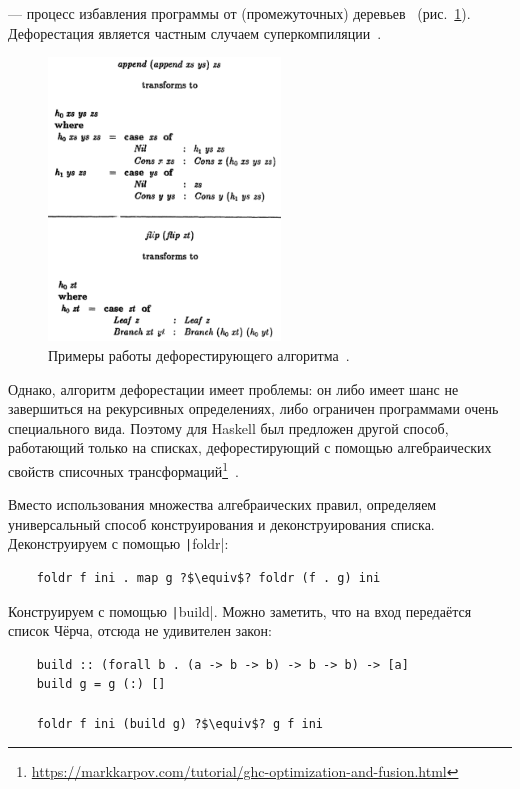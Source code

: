  --- процесс избавления программы от (промежуточных) деревьев~\cite{wadler1988deforestation} (рис.~\ref{fig:deforestation-examples}).
Дефорестация является частным случаем суперкомпиляции~\cite{supercomp}.

\begin{figure}
    \centering
    \includegraphics[width=0.55\textwidth]{figs/deforestation-examples}
    \caption{Примеры работы дефорестирующего алгоритма~\cite{wadler1988deforestation}.}
    \label{fig:deforestation-examples}
\end{figure}

Однако, алгоритм дефорестации имеет проблемы: он либо имеет шанс не завершиться на рекурсивных определениях, либо ограничен программами очень специального вида.
Поэтому для Haskell был предложен другой способ, работающий только на списках, дефорестирующий с помощью алгебраических свойств списочных трансформаций\footnote{\url{https://markkarpov.com/tutorial/ghc-optimization-and-fusion.html}}~\cite{gill1993short}.

Вместо использования множества алгебраических правил, определяем универсальный способ конструирования и деконструирования списка.
Деконструируем с помощью \texttt|foldr|:
\begin{verbatim}
    foldr f ini . map g ?$\equiv$? foldr (f . g) ini
\end{verbatim}

Конструируем с помощью \texttt|build|.
Можно заметить, что на вход передаётся список Чёрча, отсюда не удивителен закон:
\begin{verbatim}
    build :: (forall b . (a -> b -> b) -> b -> b) -> [a]
    build g = g (:) []

    foldr f ini (build g) ?$\equiv$? g f ini
\end{verbatim}

